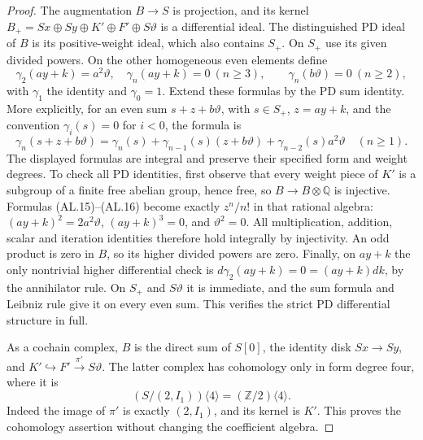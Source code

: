\begin{proof}
The augmentation $B\to S$ is projection, and its kernel
$B_+=Sx\oplus Sy\oplus K'\oplus F'\oplus S\vartheta$
is a differential ideal.  The distinguished PD ideal of
$B$ is its positive-weight ideal, which also contains
$S_+$.  On $S_+$ use its given divided powers.  On the other
homogeneous even elements define
\[
 \gamma_2(a y+k)=a^2\vartheta,\quad
 \gamma_n(a y+k)=0\ (n\geq3),\qquad
 \gamma_n(b\vartheta)=0\ (n\geq2),
 \tag{AL.15}
\]
with $\gamma_1$ the identity and $\gamma_0=1$.
Extend these formulas by the PD sum identity.  More explicitly,
for an even sum $s+z+b\vartheta$, with $s\in S_+$,
$z=ay+k$, and the convention $\gamma_i(s)=0$ for $i<0$, the
formula is
\[
 \gamma_n(s+z+b\vartheta)
 =\gamma_n(s)+\gamma_{n-1}(s)(z+b\vartheta)
       +\gamma_{n-2}(s)a^2\vartheta
 \quad(n\geq1).
 \tag{AL.16}
\]
The displayed formulas are integral and preserve their
specified form and weight degrees.  To check all PD identities,
first observe that every weight piece of $K'$ is a subgroup
of a finite free abelian group, hence free, so
$B\to B\otimes\mathbb Q$ is injective.  Formulas
\textup{(AL.15)--(AL.16)} become exactly $z^n/n!$ in that
rational algebra: $(ay+k)^2=2a^2\vartheta$,
$(ay+k)^3=0$, and $\vartheta^2=0$.
All multiplication, addition, scalar and iteration identities
therefore hold integrally by injectivity.
An odd product is zero in $B$, so its higher divided powers
are zero.  Finally, on $ay+k$ the only nontrivial higher
differential check is
$d\gamma_2(ay+k)=0=(ay+k)dk$, by the annihilator rule.
On $S_+$ and $S\vartheta$ it is immediate, and the sum formula
and Leibniz rule give it on every even sum.  This verifies
the strict PD differential structure in full.

As a cochain complex, $B$ is the direct sum of $S[0]$, the
identity disk $Sx\to Sy$, and
$K'\hookrightarrow F'\xrightarrow{\pi'}S\vartheta$.
The latter complex has cohomology only in form degree four,
where it is
\[
 (S/(2,I_1))\langle4\rangle
       =(\mathbb Z/2)\langle4\rangle .
 \tag{AL.17}
\]
Indeed the image of $\pi'$ is exactly $(2,I_1)$, and its
kernel is $K'$.  This proves the cohomology assertion
without changing the coefficient algebra.


\end{proof}
